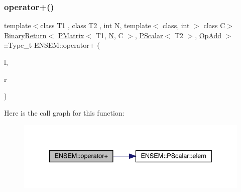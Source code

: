 \subsubsection{\texorpdfstring{operator+()}{operator+()}\hspace{0.1cm}{\footnotesize\ttfamily [3/4]}}
{\footnotesize\ttfamily template$<$class T1 , class T2 , int N, template$<$ class, int $>$ class C$>$ \\
\mbox{\hyperlink{structENSEM_1_1BinaryReturn}{Binary\+Return}}$<$ \mbox{\hyperlink{classENSEM_1_1PMatrix}{P\+Matrix}}$<$ T1, \mbox{\hyperlink{adat__devel_2lib_2hadron_2operator__name__util_8cc_a7722c8ecbb62d99aee7ce68b1752f337}{N}}, C $>$, \mbox{\hyperlink{classENSEM_1_1PScalar}{P\+Scalar}}$<$ T2 $>$, \mbox{\hyperlink{structENSEM_1_1OpAdd}{Op\+Add}} $>$\+::Type\+\_\+t E\+N\+S\+E\+M\+::operator+ (\begin{DoxyParamCaption}\item[{const \mbox{\hyperlink{classENSEM_1_1PMatrix}{P\+Matrix}}$<$ T1, \mbox{\hyperlink{adat__devel_2lib_2hadron_2operator__name__util_8cc_a7722c8ecbb62d99aee7ce68b1752f337}{N}}, C $>$ \&}]{l,  }\item[{const \mbox{\hyperlink{classENSEM_1_1PScalar}{P\+Scalar}}$<$ T2 $>$ \&}]{r }\end{DoxyParamCaption})\hspace{0.3cm}{\ttfamily [inline]}}

Here is the call graph for this function\+:\nopagebreak
\begin{figure}[H]
\begin{center}
\leavevmode
\includegraphics[width=336pt]{df/d0a/group__primmatrix_gacd1e2ab4740e640c1aa2862faf4436db_cgraph}
\end{center}
\end{figure}
\mbox{\label{group__primmatrix_ga39561cdaedaf3bb4fb108575dae42de6}} 
